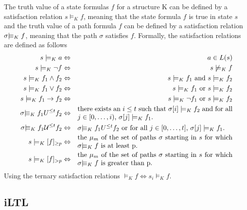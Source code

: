 The truth value of a state formulas $f$ for a structure K can be defined by a satisfaction relation $s\models_K f$, meaning that the state formula $f$ is true in state $s$ and the truth value of a path formula $f$ can be defined by a satisfaction relation $\sigma |\!\!\!\equiv_K f$, meaning that the path $\sigma$ satisfies $f$. Formally, the satisfaction relations are defined as follows
\begin{eqnarray*}
s\models_K a &\Leftrightarrow& a \in L(s)\\
s\models_K\neg f &\Leftrightarrow& s \not\models_K f\\
s\models_K f_1 \wedge f_2 &\Leftrightarrow& s\models_K f_1\mbox{ and }s\models_K f_2\\
s\models_K f_1 \vee   f_2 &\Leftrightarrow& s\models_K f_1\mbox{ or }s\models_K f_2\\
s\models_K f_1\rightarrow f_2 &\Leftrightarrow& s\models_K\neg f_1\mbox{ or }s\models_K f_2\\
\sigma\Models_K f_1 U^{\leq t} f_2 &\Leftrightarrow& \parbox{8cm}{there exists an $i\leq t$ such that $\sigma[i]\models_K f_2$ and for all $j\in[0,\ldots,i)$, $\sigma[j]\models_K f_1$.}\\
\sigma\Models_K f_1 {\cal U}^{\leq t} f_2 &\Leftrightarrow& \parbox{8cm}{$\sigma\Models_K f_1 U^{\leq t} f_2$ or for all $j\in[0,\ldots,t]$, $\sigma[j]\models_K f_1$.}\\
s\models_K[f]_{\geq p} &\Leftrightarrow&\parbox{8cm}{the $\mu_m$ of the set of paths $\sigma$ starting in $s$ for which $\sigma\Models_K f$ is at least p.}\\
s\models_K[f]_{> p} &\Leftrightarrow&\parbox{8cm}{the $\mu_m$ of the set of paths $\sigma$ starting in $s$ for which $\sigma\Models_K f$ is greater than p.}
\end{eqnarray*}
Using the ternary satisfaction relations $\models_K f \Leftrightarrow s_i \models_K f$.

\subsection{iLTL}

